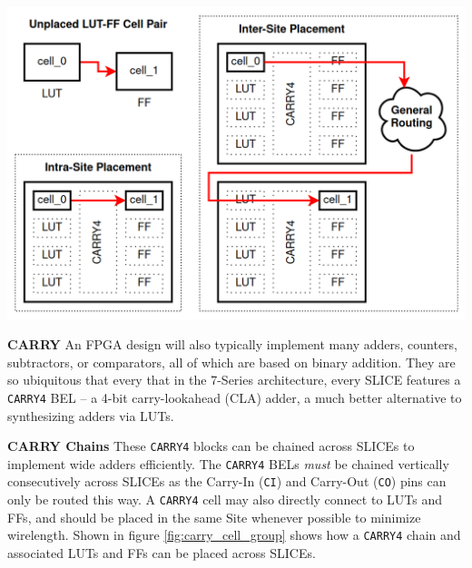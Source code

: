 \documentclass{article}
\begin{document}
\begin{multicols}{2}
        {
            \centering
            \includegraphics[width=\columnwidth]{figures/intersite_intrasite_2.png}
            \label{fig:intersite_intrasite}
        }


    \newpage
    \textbf{CARRY} \quad
        An FPGA design will also typically implement many adders, counters, subtractors, or comparators, all of which are based on binary addition. 
        They are so ubiquitous that every that in the 7-Series architecture, every SLICE features a \texttt{CARRY4} BEL -- a 4-bit carry-lookahead (CLA) adder, a much better alternative to synthesizing adders via LUTs. 

    \textbf{CARRY Chains} \quad
        These \texttt{CARRY4} blocks can be chained across SLICEs to implement wide adders efficiently. 
        The \texttt{CARRY4} BELs \emph{must} be chained vertically consecutively across SLICEs as the Carry-In (\texttt{CI}) and Carry-Out (\texttt{CO}) pins can only be routed this way. 
        A \texttt{CARRY4} cell may also directly connect to LUTs and FFs, and should be placed in the same Site whenever possible to minimize wirelength. 
        Shown in figure \ref{fig:carry_cell_group} shows how a \texttt{CARRY4} chain and associated LUTs and FFs can be placed across SLICEs. 



\end{multicols}
\end{document}
